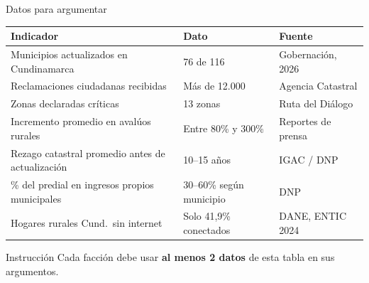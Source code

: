 \documentclass[aspectratio=169]{beamer}
\begin{document}
\begin{frame}{Datos para argumentar}
  \scriptsize
  \begin{tabularx}{\textwidth}{@{}X l l@{}}
    \toprule
    \textbf{Indicador} & \textbf{Dato} & \textbf{Fuente} \\
    \midrule
    Municipios actualizados en Cundinamarca & 76 de 116 & Gobernación, 2026 \\
    Reclamaciones ciudadanas recibidas & Más de 12.000 & Agencia Catastral \\
    Zonas declaradas críticas & 13 zonas & Ruta del Diálogo \\
    Incremento promedio en avalúos rurales & Entre 80\% y 300\% & Reportes de prensa \\
    Rezago catastral promedio antes de actualización & 10--15 años & IGAC / DNP \\
    \% del predial en ingresos propios municipales & 30--60\% según municipio & DNP \\
    Hogares rurales Cund.\ sin internet & Solo 41,9\% conectados & DANE, ENTIC 2024 \\
    \bottomrule
  \end{tabularx}
  \vspace{0.6em}

  \begin{block}{\small Instrucción}
    \scriptsize Cada facción debe usar \textbf{al menos 2 datos} de esta
    tabla en sus argumentos.
  \end{block}
\end{frame}
\end{document}
